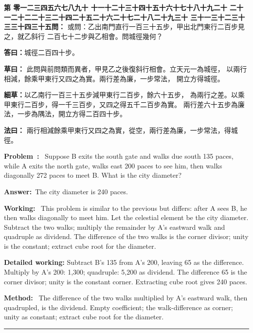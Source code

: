 \documentclass[9pt,a4paper]{article}
\newcounter{probnum}
\newcounter{overallnum}
\newcommand{\chnum}[1]{%
  \ifcase#1 零\or 一\or 二\or 三\or 四\or 五\or 六\or 七\or 八\or 九\or 十\or
    十一\or 十二\or 十三\or 十四\or 十五\or 十六\or 十七\or 十八\or 十九\or 二十\or
    二十一\or 二十二\or 二十三\or 二十四\or 二十五\or 二十六\or 二十七\or 二十八\or 二十九\or 三十\or
    三十一\or 三十二\or 三十三\or 三十四\or 三十五\fi}
\newcommand{\problem}[1]{\stepcounter{probnum}\stepcounter{overallnum}\par\noindent\textbf{\color{volcolor}第\chnum{\value{probnum}}問：}#1\par\vspace{0.15cm}}
\newcommand{\answer}[1]{\par\noindent\textbf{答曰：}#1\par\vspace{0.15cm}}
\newcommand{\working}[1]{\par\noindent\textbf{草曰：}#1\par\vspace{0.15cm}}
\newcommand{\method}[1]{\par\noindent\textbf{法曰：}#1\par\vspace{0.25cm}}
\newcommand{\eproblem}[1]{\par\noindent\textbf{\color{volcolor}Problem~\theoverallnum:}~#1\par\vspace{0.15cm}}
\newcommand{\eanswer}[1]{\par\noindent\textbf{Answer:}~#1\par\vspace{0.15cm}}
\newcommand{\eworking}[1]{\par\noindent\textbf{Working:}~#1\par\vspace{0.15cm}}
\newcommand{\emethod}[1]{\par\noindent\textbf{Method:}~#1\par\vspace{0.25cm}}
\begin{document}
\noindent\begin{minipage}[t]{0.48\textwidth}
\problem{
或問：乙出南門直行一百三十五步，甲出北門東行二百步見之，就乙斜行
二百七十二步與乙相會。問城徑幾何？
}

\answer{城徑二百四十步。}

\working{
此問與前問類而異者，甲見乙之後復斜行相會。立天元一為城徑，
以兩行相減，餘乘甲東行又四之為實。兩行差為廉，一步常法，
開立方得城徑。

\textbf{細草：}以乙南行一百三十五步減甲東行二百步，餘六十五步，
為兩行之差。以乘甲東行二百步，得一千三百步，又四之得五千二百步為實。
兩行差六十五步為廉法，一步為隅法，開立方得二百四十步。
}

\method{
兩行相減餘乘甲東行又四之為實，從空，兩行差為廉，一步常法，得城徑。
}
\end{minipage}%
\hfill%
\begin{minipage}[t]{0.50\textwidth}
\eproblem{
Suppose B exits the south gate and walks due south 135 paces, while A exits
the north gate, walks east 200 paces to see him, then walks diagonally 272
paces to meet B. What is the city diameter?
}

\eanswer{The city diameter is 240 paces.}

\eworking{
This problem is similar to the previous but differs: after A sees B, he then
walks diagonally to meet him. Let the celestial element be the city diameter.
Subtract the two walks; multiply the remainder by A's eastward walk and
quadruple as dividend. The difference of the two walks is the corner divisor;
unity is the constant; extract cube root for the diameter.

\textbf{Detailed working:} Subtract B's 135 from A's 200, leaving 65 as the
difference. Multiply by A's 200: 1,300; quadruple: 5,200 as dividend.
The difference 65 is the corner divisor; unity is the constant corner.
Extracting cube root gives 240 paces.
}

\emethod{
The difference of the two walks multiplied by A's eastward walk, then
quadrupled, is the dividend. Empty coefficient; the walk-difference as corner;
unity as constant; extract cube root for the diameter.
}
\end{minipage}
\vspace{0.15cm}

\vspace{0.15cm}
\noindent\rule{\textwidth}{0.2pt}
\vspace{0.15cm}
\end{document}

